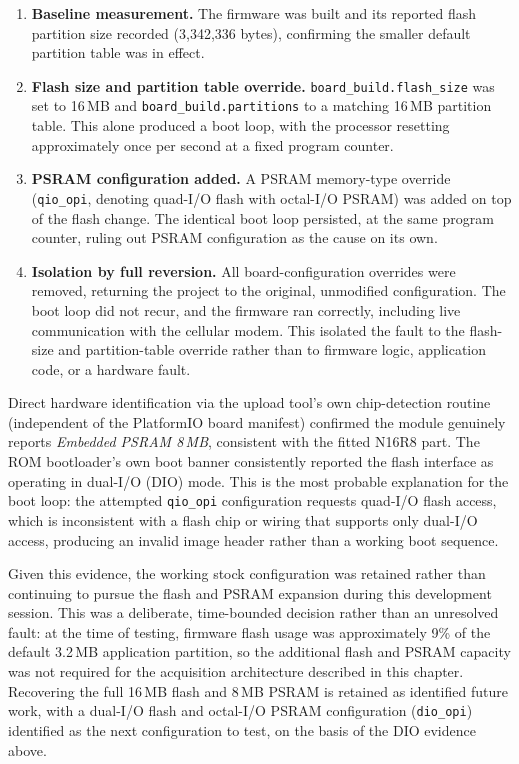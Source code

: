 \begin{enumerate}
\item \textbf{Baseline measurement.} The firmware was built and its reported flash partition size recorded (3{,}342{,}336 bytes), confirming the smaller default partition table was in effect.
\item \textbf{Flash size and partition table override.} \texttt{board\_build.flash\_size} was set to 16\,MB and \texttt{board\_build.partitions} to a matching 16\,MB partition table. This alone produced a boot loop, with the processor resetting approximately once per second at a fixed program counter.
\item \textbf{PSRAM configuration added.} A PSRAM memory-type override (\texttt{qio\_opi}, denoting quad-I/O flash with octal-I/O PSRAM) was added on top of the flash change. The identical boot loop persisted, at the same program counter, ruling out PSRAM configuration as the cause on its own.
\item \textbf{Isolation by full reversion.} All board-configuration overrides were removed, returning the project to the original, unmodified configuration. The boot loop did not recur, and the firmware ran correctly, including live communication with the cellular modem. This isolated the fault to the flash-size and partition-table override rather than to firmware logic, application code, or a hardware fault.
\end{enumerate}

Direct hardware identification via the upload tool's own chip-detection routine (independent of the PlatformIO board manifest) confirmed the module genuinely reports \emph{Embedded PSRAM 8\,MB}, consistent with the fitted N16R8 part. The ROM bootloader's own boot banner consistently reported the flash interface as operating in dual-I/O (DIO) mode. This is the most probable explanation for the boot loop: the attempted \texttt{qio\_opi} configuration requests quad-I/O flash access, which is inconsistent with a flash chip or wiring that supports only dual-I/O access, producing an invalid image header rather than a working boot sequence.

Given this evidence, the working stock configuration was retained rather than continuing to pursue the flash and PSRAM expansion during this development session. This was a deliberate, time-bounded decision rather than an unresolved fault: at the time of testing, firmware flash usage was approximately 9\% of the default 3.2\,MB application partition, so the additional flash and PSRAM capacity was not required for the acquisition architecture described in this chapter. Recovering the full 16\,MB flash and 8\,MB PSRAM is retained as identified future work, with a dual-I/O flash and octal-I/O PSRAM configuration (\texttt{dio\_opi}) identified as the next configuration to test, on the basis of the DIO evidence above.


